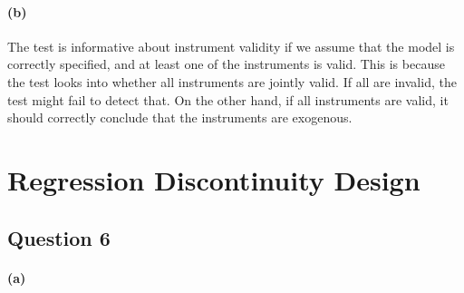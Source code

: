 \documentclass{scrartcl}
\begin{document}







\paragraph*{(b)}

The test is informative about instrument validity if we assume that the model is correctly specified, and at least one of the instruments is valid. This is because the test looks into whether all instruments are jointly valid. If all are invalid, the test might fail to detect that. On the other hand, if all instruments are valid, it should correctly conclude that the instruments are exogenous. 


\section*{Regression Discontinuity Design}

\subsection*{Question 6}

\paragraph*{(a)}
\end{document}
